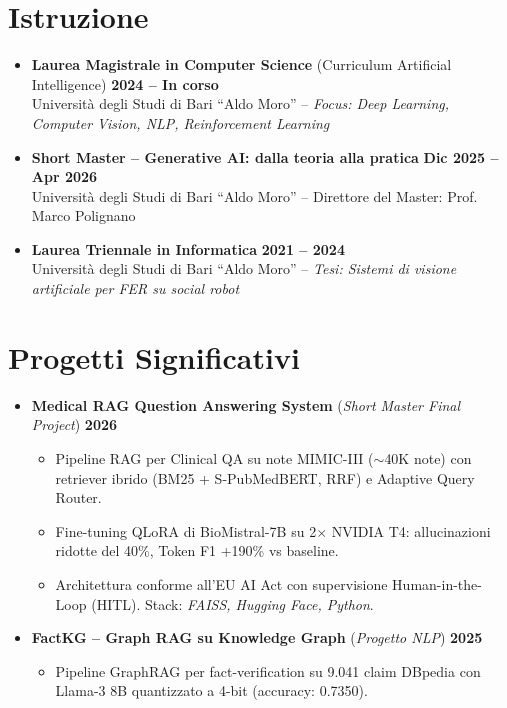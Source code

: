\documentclass[a4paper,10pt]{article}
\begin{document}
\section{Istruzione}
\begin{itemize}
    \item \textbf{Laurea Magistrale in Computer Science} (Curriculum Artificial Intelligence) \hfill \textbf{2024 -- In corso}\\
    Università degli Studi di Bari ``Aldo Moro'' -- \textit{Focus: Deep Learning, Computer Vision, NLP, Reinforcement Learning}
    \item \textbf{Short Master -- Generative AI: dalla teoria alla pratica} \hfill \textbf{Dic 2025 -- Apr 2026}\\
    Università degli Studi di Bari ``Aldo Moro'' -- Direttore del Master: Prof. Marco Polignano
    \item \textbf{Laurea Triennale in Informatica} \hfill \textbf{2021 -- 2024}\\
    Università degli Studi di Bari ``Aldo Moro'' -- \textit{Tesi: Sistemi di visione artificiale per FER su social robot}
\end{itemize}

\section{Progetti Significativi}
\begin{itemize}
    \item \textbf{Medical RAG Question Answering System} (\textit{Short Master Final Project}) \hfill \textbf{2026}
    \begin{itemize}
        \item Pipeline RAG per Clinical QA su note MIMIC-III ($\sim$40K note) con retriever ibrido (BM25 + S-PubMedBERT, RRF) e Adaptive Query Router.
        \item Fine-tuning QLoRA di BioMistral-7B su 2$\times$ NVIDIA T4: allucinazioni ridotte del 40\%, Token F1 +190\% vs baseline.
        \item Architettura conforme all'EU AI Act con supervisione Human-in-the-Loop (HITL). Stack: \textit{FAISS, Hugging Face, Python}.
    \end{itemize}
    \item \textbf{FactKG -- Graph RAG su Knowledge Graph} (\textit{Progetto NLP}) \hfill \textbf{2025}
    \begin{itemize}
        \item Pipeline GraphRAG per fact-verification su 9.041 claim DBpedia con Llama-3 8B quantizzato a 4-bit (accuracy: 0.7350).
    \end{itemize}
\end{itemize}
\end{document}

